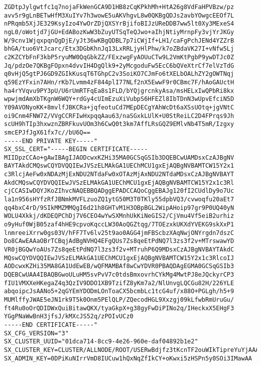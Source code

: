 \begin{lstlisting}
ZGDtpJylgwtfc1q7nojaFkWenGCA9D1HB8zCqKPkhMh+HtA26g8VdFaHPVBzw/pz
avv5r9gLnBETwHfM3XuIYv7h3wowE5uAKVhgvL8w0QKBgQDJs2avbYOwgcEEOf7L
nPRqmb5XjJE329KsyIzo4YwOrZDjQXSYrBjifoBIJzUReDDB7ww5lt0Xy3MExeS4
ngL0/oWotjd7jGU+EdABozKwW3bZuyUTSqTeQJwo+aIhjNtiyMrnpFy3vjYrJKGy
W/9cnv1WjqxpqnQgDjE/yJt36wKBgQDBL7p7iCWjIf+LH1/caFgPchJENd4YZZrB
bhGA/tuo6VtJcarc/Etx3DGbKhnJq13LxRRLjyHlPhw/k7oZBdaVK27I+vNfw5Lj
c2KZCYbFnF3kbP5ryuMW0QqGbkZZ/FExzwgFyAOUuCTw9L2VmKtPgbP9ywDTJc0Z
Jq/pdzOe7QKBgFOpxn4dvvIH4DgQlk9+2yMcgoduFw5EcC6bQVeXtrCf7elVzTdG
q0vHjQ5gtPJ6GD9ZGIkKusqT6TGhpC2v3SoiKO7CJmFo6tXELbOALhZY2gOWTNqj
q59EzYFxin7AHn/rKb7Lvmm4zF844plI77NLf2nX5EwwF9r0CBmc7F/hAoGAUctH
ha4rYVqvu9PY3pU/U6rUmRTFqEa8s1FLD/bYQjgrcnkyAsa/msHELxIwQPbRi8kx
wpwjmdAmXbTKgnW6WQY+rdGy4cUImEzuXiVubpS6HFEZl8IbTDnN3wUpvEfciN5D
Y09AVONyoKK+8mvlfJBKCRa+jqfeotuCd7MEpDECgYAhWcDt6aXSsUOtq+jgVNtC
oi9Cnm4FNW7Z/VVgCCRFIwHxpqqAau63/naSGxkLUlK+U0StReiLC2D4FPrqs9Jh
scUH9hTIp3hxwznZBRFkuvUOm3h6CwQ0t3km7AffLRsGQZ9EMlvNb4T5mR/Izgxy
smcEPJfJgX61fx7c//bU6Q==
-----END PRIVATE KEY-----"
SX_SSL_CERT="-----BEGIN CERTIFICATE-----
MIIDpzCCAo+gAwIBAgIJAODcwxKZHi35MA0GCSqGSIb3DQEBCwUAMDsxCzAJBgNV
BAYTAkdCMQswCQYDVQQIEwJVSzELMAkGA1UEChMCU1gxEjAQBgNVBAMTCW15Y2x1
c3RlcjAeFw0xNDAzMjExNDU2NTdaFw0xOTAzMjAxNDU2NTdaMDsxCzAJBgNVBAYT
AkdCMQswCQYDVQQIEwJVSzELMAkGA1UEChMCU1gxEjAQBgNVBAMTCW15Y2x1c3Rl
cjCCASIwDQYJKoZIhvcNAQEBBQADggEPADCCAQoCggEBAJg120fI2CUdlDy9o7Uc
la1n956sHYfzRfJBNmkMVFLzuoZQ1ytG50M3T0TKly55dpbVQ3/cvwoqfu20aEt7
qq4bxC4rD/9SIkMMZMMQgI6d21h8GHTvM1H3OBpBGL2WipAHoip97gr9P0UQ40yN
WOLU4Xkkj/dKDEQPChDj7V6CEO4wYwSXMnhUkKiNeGIS2/CjVmu4Vf5eiB2urhiz
o9yHuf0WjB05zaf4hHE9cpvoKqccLW30AoQGZtqg/7TOEzxkUKXdYVEKG9skXxP1
lnmreeiXrrw0gs03V/hFF7Tv6lv25t9ao0AGG4jmFBScbzXAqNwjONYrgdn7dszC
Do8CAwEAAaOBrTCBqjAdBgNVHQ4EFgQUs7Zs8qeEtPdNQ7l3zs3f2v+MTrswawYD
VR0jBGQwYoAUs7Zs8qeEtPdNQ7l3zs3f2v+MTruhP6Q9MDsxCzAJBgNVBAYTAkdC
MQswCQYDVQQIEwJVSzELMAkGA1UEChMCU1gxEjAQBgNVBAMTCW15Y2x1c3RlcoIJ
AODcwxKZHi35MA8GA1UdEwEB/wQFMAMBAf8wCwYDVR0PBAQDAgEGMA0GCSqGSIb3
DQEBCwUAA4IBAQBGwoULuHM5svPvV7c0tdsBmxovrhCYkMg4MwtPJ8eJQckyrCP3
fIU1VMXXeHKegaZ4q3QzIV9DDO1XB9TzifZ8yKm7a2/NlUnvgLQCGu82H/226YLE
abqoipcJsAANo5+2qGYEmYDODmLOnToaCX5bcmbLc1tcG4uf/x88O+PGLgh/h5+9
MUMlffyJWAE5eJN1rk9T5k0Onm5PElQLP/ZQecodHGL9Xxzgj09kLfwbRmUruGu/
ft4Ru0oOrQDIDWxQuiBitawQKX/tyaGkpX+g38gyFwDiPINo2q/IHeckxX5EHgF3
YGgPNaWwBnH3jfsJ/kMXcJS52q/zPOIvUCz0
-----END CERTIFICATE-----"
SX_CFG_VERSION="3"
SX_CLUSTER_UUID="01dca714-8cc9-4e26-960e-daf04892b1e2"
SX_CLUSTER_KEY=CLUSTER/ALLNODE/ROOT/USERwBdjfz3tKcnTF2ouWIkTipreYuYjAAA
SX_ADMIN_KEY=0DPiKuNIrrVmD8IUCuw1hQxNqZfIkCY+oKwxi5zHSPn5y0SOi3IMawAA
\end{lstlisting}
